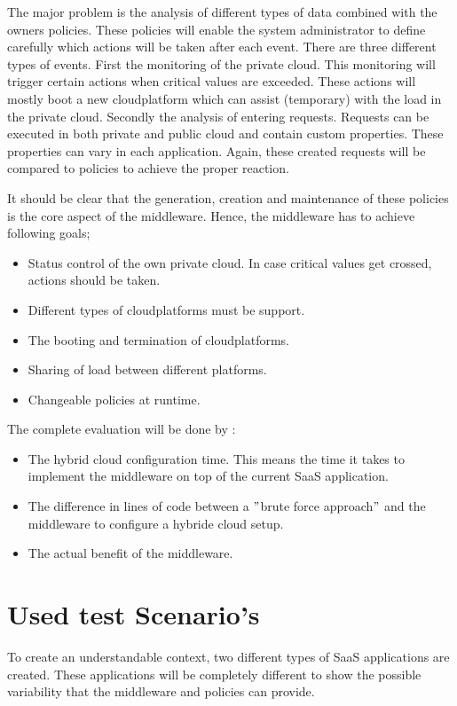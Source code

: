 \documentclass[journal]{IEEEtran}
\begin{document}
The major problem is the analysis of different types of data combined with the owners policies.
These policies will enable the system administrator to define carefully which actions will be taken after each event.
There are three different types of events.
First the monitoring of the private cloud.
This monitoring will trigger certain actions when critical values are exceeded.
These actions will mostly boot a new cloudplatform which can assist (temporary) with the load in the private cloud.
Secondly the analysis of entering requests.
Requests can be executed in both private and public cloud and contain custom properties.
These properties can vary in each application.
Again, these created requests will be compared to policies to achieve the proper reaction.\newline

It should be clear that the generation, creation and maintenance of these policies is the core aspect of the middleware.
Hence, the middleware has to achieve following goals;
\begin{itemize}
    \item Status control of the own private cloud.  In case critical values get crossed, actions should be taken.
    \item Different types of cloudplatforms must be support.
    \item The booting and termination of cloudplatforms.
    \item Sharing of load between different platforms.
    \item Changeable policies at runtime.
\end{itemize}

The complete evaluation will be done by :
\begin{itemize}
    \item The hybrid cloud configuration time.  This means the time it takes to implement the middleware on top of the current SaaS application.
    \item The difference in lines of code between a $"$brute force approach$"$ and the middleware to configure a hybride cloud setup.
    \item The actual benefit of the middleware.
\end{itemize}

\section{Used test Scenario's}\label{scenario}
To create an understandable context, two different types of SaaS applications are created.
These applications will be completely different to show the possible variability that the middleware and policies can provide.\newline
\end{document}
